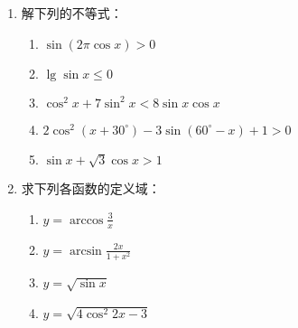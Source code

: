 \begin{enumerate}
\item 解下列的不等式：
\begin{enumerate}
\item $\sin (2 \pi \cos x)>0$
\item $\lg \sin x \leqslant 0$
\item $\cos ^{2} x+7 \sin ^{2} x<8 \sin x \cos x$
\item $2 \cos ^{2}\left(x+30^{\circ}\right)-3 \sin \left(60^{\circ}-x\right)+1>0$
\item $\sin x+\sqrt{3} \cos x>1$
\end{enumerate}


\item 求下列各函数的定义域：
\begin{multicols}{2}
   \begin{enumerate}
\item $y=\arccos \frac{3}{x}$
\item $y=\arcsin \frac{2 x}{1+x^{2}}$
\item $y=\sqrt{\sin x}$
\item $y=\sqrt{4 \cos ^{2} 2 x-3}$
\end{enumerate} 
\end{multicols}

\end{enumerate}





